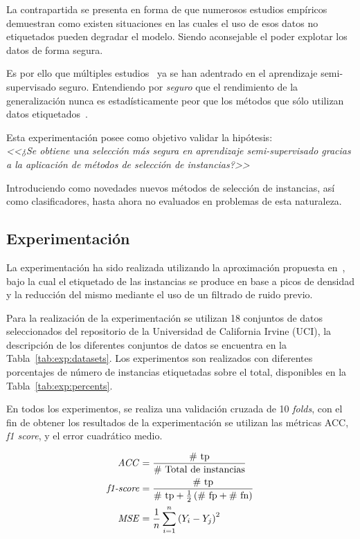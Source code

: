 La contrapartida se presenta en forma de que numerosos estudios empíricos demuestran como existen situaciones en las cuales el uso de esos datos no etiquetados pueden degradar el modelo. Siendo aconsejable el poder explotar los datos de forma segura.

Es por ello que múltiples estudios~\cite{zhao2021safe, guo2020safe, li2016towards} ya se han adentrado en el aprendizaje semi-supervisado seguro. Entendiendo por \emph{seguro} que el rendimiento de la generalización nunca es estadísticamente peor que los métodos que sólo utilizan datos etiquetados~\cite{li2019safe}.

Esta experimentación posee como objetivo validar la hipótesis:\\
\emph{<<¿Se obtiene una selección más segura en aprendizaje semi-supervisado gracias a la aplicación de métodos de selección de instancias?>>}

Introduciendo como novedades nuevos métodos de selección de instancias, así como clasificadores, hasta ahora no evaluados en problemas de esta naturaleza.

\subsection{Experimentación}
La experimentación ha sido realizada utilizando la aproximación propuesta en~\cite{li2019selfk}, bajo la cual el etiquetado de las instancias se produce en base a picos de densidad y la reducción del mismo mediante el uso de un filtrado de ruido previo.

Para la realización de la experimentación se utilizan 18 conjuntos de datos seleccionados del repositorio de la Universidad de California Irvine (UCI), la descripción de los diferentes conjuntos de datos se encuentra en la Tabla~\ref{tab:exp:datasets}. Los experimentos son realizados con diferentes porcentajes de número de instancias etiquetadas sobre el total, disponibles en la Tabla~\ref{tab:exp:percents}.

En todos los experimentos, se realiza una validación cruzada de 10 \textit{folds}, con el fin de obtener los resultados de la experimentación se utilizan las métricas ACC, \textit{f1 score}, y el error cuadrático medio.

\begin{align}
\text{\textit{ACC}} & = \frac{\text{\# tp}}{\text{\# Total de instancias}} \\
\text{\textit{f1-score}} & = \frac{\text{\# tp}}{\text{\# tp} + \frac{1}{2}\left( \text{\# fp} + \text{\# fn}\right)} \\
\text{\textit{MSE}} & = \frac{1}{n} \sum_{i=1}^{n}\left(Y_i - Y_j\right)^2
\end{align}

